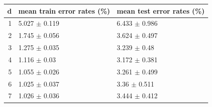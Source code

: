 \begin{tabular}{rll}
\toprule
d & mean train error rates (\%) & mean test error rates (\%) \\
\midrule
1 & 5.027 $\pm$ 0.119 & 6.433 $\pm$ 0.986 \\
2 & 1.745 $\pm$ 0.056 & 3.624 $\pm$ 0.497 \\
3 & 1.275 $\pm$ 0.035 & 3.239 $\pm$ 0.48 \\
4 & 1.116 $\pm$ 0.03 & 3.172 $\pm$ 0.381 \\
5 & 1.055 $\pm$ 0.026 & 3.261 $\pm$ 0.499 \\
6 & 1.025 $\pm$ 0.037 & 3.36 $\pm$ 0.511 \\
7 & 1.026 $\pm$ 0.036 & 3.444 $\pm$ 0.412 \\
\bottomrule
\end{tabular}
